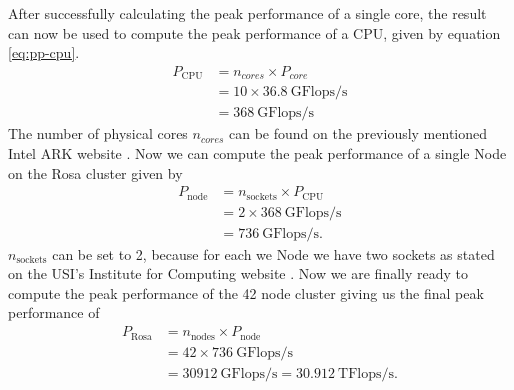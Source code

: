 \newline
After successfully calculating the peak performance of a single core, the result can now be used to compute the peak performance of a CPU, given by equation \ref{eq:pp-cpu}.
\begin{equation}\label{eq:pp-cpu}
	\begin{aligned}
		P_{\text{CPU}} & = n_{cores} \times P_{core}        \\
		               & = 10 \times 36.8 \ \text{GFlops/s} \\
		               & = 368 \ \text{GFlops/s}
	\end{aligned}
\end{equation}
The number of physical cores $n_{cores}$ can be found on the previously mentioned Intel ARK website \cite{noauthor_intel_nodate}.
Now we can compute the peak performance of a single Node on the Rosa cluster given by
\begin{equation}
	\begin{aligned}
		P_{\text{node}} & = n_{\text{sockets}} \times P_{\text{CPU}} \\
		                & =	2 \times  368 \ \text{GFlops/s}          \\
		                & =  736 \ \text{GFlops/s}.
	\end{aligned}
\end{equation}
$n_{\text{sockets}}$ can be set to 2, because for each we Node we have two sockets as stated on the USI's Institute for Computing website \cite{noauthor_compute_nodate}.
Now we are finally ready to compute the peak performance of the 42 node cluster giving us the final peak performance of
\begin{equation}
	\begin{aligned}
		P_{\text{Rosa}} & = n_{\text{nodes}} \times P_{\text{node}}              \\
		                & = 42 \times  736 \ \text{GFlops/s}                     \\
		                & =  30912 \ \text{GFlops/s} = 30.912 \ \text{TFlops/s}.
	\end{aligned}
\end{equation}

